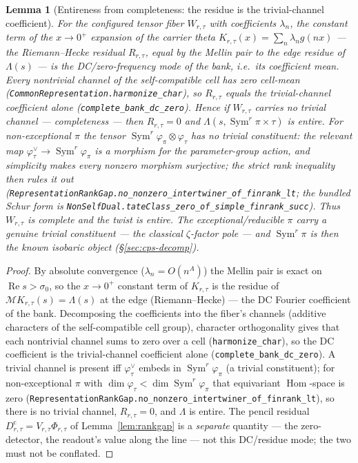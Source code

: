 \documentclass[11pt]{article}
\newtheorem{lemma}[theorem]{Lemma}
\theoremstyle{definition}
\renewcommand{\Re}{\operatorname{Re}}
\newcommand{\Sym}{\operatorname{Sym}}
\begin{document}
\begin{lemma}[Entireness from completeness: the residue is the trivial-channel coefficient]\label{lem:completeness}
For the configured tensor fiber $W_{r,\tau}$ with coefficients $\lambda_n$, the constant term of the
$x\to0^{+}$ expansion of the carrier theta $K_{r,\tau}(x)=\sum_{n}\lambda_n g(nx)$ --- the Riemann--Hecke
residual $R_{r,\tau}$, equal by the Mellin pair to the edge residue of $\Lambda(s)$ --- is the DC/zero-frequency
mode of the bank, i.e.\ its \emph{coefficient mean}. Every \emph{nontrivial} channel of the self-compatible
cell has zero cell-mean (\texttt{CommonRepresentation.harmonize\_char}), so $R_{r,\tau}$ equals the
\emph{trivial-channel coefficient alone} (\texttt{complete\_bank\_dc\_zero}). Hence if $W_{r,\tau}$ carries
\emph{no trivial channel} --- \emph{completeness} --- then $R_{r,\tau}=0$ and $\Lambda(s,\Sym^r\pi\times\tau)$ is
entire. For non-exceptional $\pi$ the tensor $\Sym^r\varphi_\pi\otimes\varphi_\tau$ has no trivial constituent:
the relevant map $\varphi_\tau^\vee\to\Sym^r\varphi_\pi$ is a morphism for the parameter-group action,
and simplicity makes every nonzero morphism surjective; the strict rank inequality then rules it out
(\texttt{RepresentationRankGap.no\_nonzero\_intertwiner\_of\_finrank\_lt}; the bundled Schur form is
\texttt{NonSelfDual.tateClass\_zero\_of\_simple\_finrank\_succ}).  Thus $W_{r,\tau}$ is complete and the twist is entire. The exceptional/reducible $\pi$ carry a genuine
trivial constituent --- the classical $\zeta$-factor pole --- and $\Sym^r\pi$ is then the known isobaric object
(\S\ref{sec:cps-decomp}).
\end{lemma}
\begin{proof}
By absolute convergence ($\lambda_n=O(n^{A})$) the Mellin pair is exact on $\Re s>\sigma_0$, so the $x\to0^{+}$
constant term of $K_{r,\tau}$ is the residue of $\mathcal M K_{r,\tau}(s)=\Lambda(s)$ at the edge (Riemann--Hecke)
--- the DC Fourier coefficient of the bank. Decomposing the coefficients into the fiber's channels (additive
characters of the self-compatible cell group), character orthogonality gives that each nontrivial channel sums to
zero over a cell (\texttt{harmonize\_char}), so the DC coefficient is the trivial-channel coefficient alone
(\texttt{complete\_bank\_dc\_zero}). A trivial channel is present iff $\varphi_\tau^\vee$ embeds in
$\Sym^r\varphi_\pi$ (a trivial constituent); for non-exceptional $\pi$ with
$\dim\varphi_\tau<\dim\Sym^r\varphi_\pi$ that equivariant $\operatorname{Hom}$-space is zero
(\texttt{RepresentationRankGap.no\_nonzero\_intertwiner\_of\_finrank\_lt}), so there is no trivial channel, $R_{r,\tau}=0$, and $\Lambda$ is
entire. The pencil residual $D^{\mathrm c}_{r,\tau}=V_{r,\tau}\Phi_{r,\tau}$ of Lemma~\ref{lem:rankgap} is a
\emph{separate} quantity --- the zero-detector, the readout's value along the line --- not this DC/residue mode;
the two must not be conflated.
\end{proof}
\end{document}
